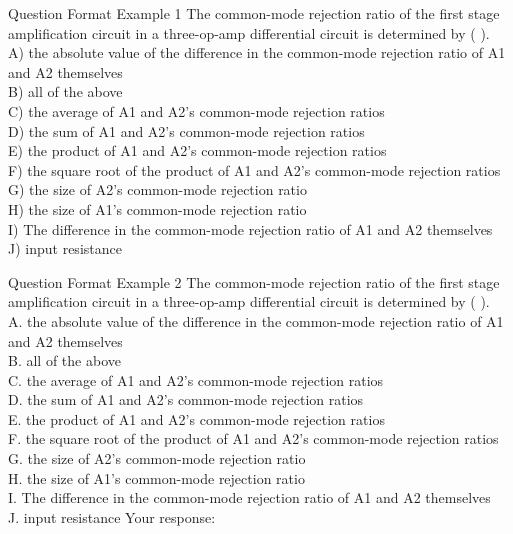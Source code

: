 \begin{promptbox}{Question Format Example 1}
The common-mode rejection ratio of the first stage amplification circuit in a three-op-amp differential circuit is determined by ( ).  
\\
A) the absolute value of the difference in the common-mode rejection ratio of A1 and A2 themselves  
\\
B) all of the above  
\\
C) the average of A1 and A2's common-mode rejection ratios  
\\
D) the sum of A1 and A2's common-mode rejection ratios  
\\
E) the product of A1 and A2's common-mode rejection ratios  
\\
F) the square root of the product of A1 and A2's common-mode rejection ratios  
\\
G) the size of A2's common-mode rejection ratio  
\\
H) the size of A1's common-mode rejection ratio  
\\
I) The difference in the common-mode rejection ratio of A1 and A2 themselves  
\\
J) input resistance  
\end{promptbox}

\begin{promptbox}{Question Format Example 2}
The common-mode rejection ratio of the first stage amplification circuit in a three-op-amp differential circuit is determined by ( ).  
\\
A. the absolute value of the difference in the common-mode rejection ratio of A1 and A2 themselves  
\\
B. all of the above  
\\
C. the average of A1 and A2's common-mode rejection ratios  
\\
D. the sum of A1 and A2's common-mode rejection ratios  
\\
E. the product of A1 and A2's common-mode rejection ratios  
\\
F. the square root of the product of A1 and A2's common-mode rejection ratios  
\\
G. the size of A2's common-mode rejection ratio  
\\
H. the size of A1's common-mode rejection ratio  
\\
I. The difference in the common-mode rejection ratio of A1 and A2 themselves  
\\
J. input resistance  
Your response: 

\end{promptbox}


